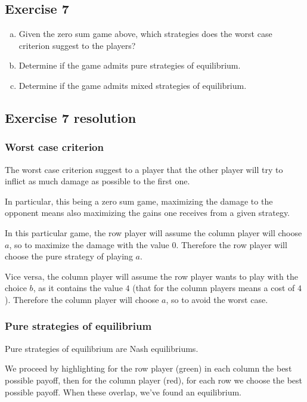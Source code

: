 \documentclass[\main/main.tex]{subfiles}
\begin{document}
\subsection{Exercise 7}

\begin{enumerate}[a)]
	\item Given the zero sum game above, which strategies does the worst case criterion suggest to the players?
	\item Determine if the game admits pure strategies of equilibrium.
	\item Determine if the game admits mixed strategies of equilibrium.
\end{enumerate}

\subsection{Exercise 7 resolution}
\subsubsection*{Worst case criterion}
The worst case criterion suggest to a player that the other player will try to inflict as much damage as possible to the first one.

In particular, this being a zero sum game, maximizing the damage to the opponent means also maximizing the gains one receives from a given strategy.

In this particular game, the row player will assume the column player will choose $a$, so to maximize the damage with the value $0$. Therefore the row player will choose the pure strategy of playing $a$.

Vice versa, the column player will assume the row player wants to play with the choice $b$, as it contains the value $4$ (that for the column players means a cost of $4$). Therefore the column player will choose $a$, so to avoid the worst case.

\subsubsection*{Pure strategies of equilibrium}
Pure strategies of equilibrium are Nash equilibriums.

We proceed by highlighting for the row player (green) in each column the best possible payoff, then for the column player (red), for each row we choose the best possible payoff. When these overlap, we've found an equilibrium.
\end{document}
